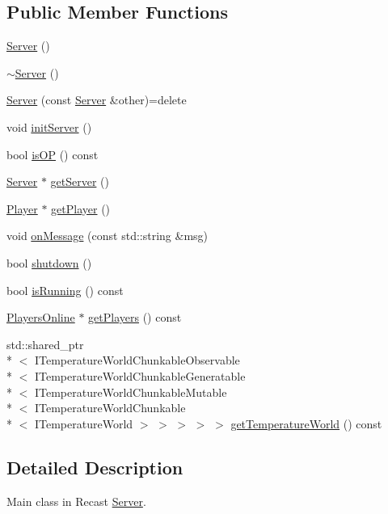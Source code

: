 \subsection*{Public Member Functions}
\begin{DoxyCompactItemize}
\item 
\hyperlink{class_server_ad5ec9462b520e59f7ea831e157ee5e59}{Server} ()
\item 
\hyperlink{class_server_a4b3aa2579cb1c8cd1d069582c14d0fa6}{$\sim$\-Server} ()
\item 
\hyperlink{class_server_aca4a9834f8bf136619d3c4cdb1db4e1e}{Server} (const \hyperlink{class_server}{Server} \&other)=delete
\item 
void \hyperlink{class_server_a7bc5c00fa3ae1ddfae71274ee7d025ea}{init\-Server} ()
\item 
bool \hyperlink{class_server_a7b6439f1e85af364215c544d675ea972}{is\-O\-P} () const 
\item 
\hyperlink{class_server}{Server} $\ast$ \hyperlink{class_server_a8af940772beedcc0b1243adf3f5aec0c}{get\-Server} ()
\item 
\hyperlink{struct_player}{Player} $\ast$ \hyperlink{class_server_a35be365123751e27d6c52ad3962b9b1e}{get\-Player} ()
\item 
void \hyperlink{class_server_a37a56fedea3137e9b8080ee0e86e8278}{on\-Message} (const std\-::string \&msg)
\item 
bool \hyperlink{class_server_a58c74bafaaf20b24e9243c7cf5fdfd16}{shutdown} ()
\item 
bool \hyperlink{class_server_ab8c22a0d6809e9aa84bebce478ba7bc5}{is\-Running} () const 
\item 
\hyperlink{class_players_online}{Players\-Online} $\ast$ \hyperlink{class_server_ab103cde2777536fa63b2746b6e0a98d4}{get\-Players} () const 
\item 
std\-::shared\-\_\-ptr\\*
$<$ I\-Temperature\-World\-Chunkable\-Observable\\*
$<$ I\-Temperature\-World\-Chunkable\-Generatable\\*
$<$ I\-Temperature\-World\-Chunkable\-Mutable\\*
$<$ I\-Temperature\-World\-Chunkable\\*
$<$ I\-Temperature\-World $>$ $>$ $>$ $>$ $>$ \hyperlink{class_server_adea320b40e941db6ab354c63de9128e3}{get\-Temperature\-World} () const 
\end{DoxyCompactItemize}


\subsection{Detailed Description}
Main class in Recast \hyperlink{class_server}{Server}. 

